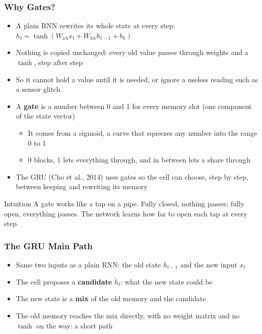 \begin{frame}[fragile] \frametitle{Why Gates?}
\begin{itemize}
\item A plain RNN rewrites its whole state at every step: $h_t = \tanh(W_{xh}x_t + W_{hh}h_{t-1} + b_h)$
\item Nothing is copied unchanged: every old value passes through weights and a $\tanh$, step after step
\item So it cannot hold a value until it is needed, or ignore a useless reading such as a sensor glitch
\item A \textbf{gate} is a number between 0 and 1 for every memory slot (one component of the state vector)
  \begin{itemize}
  \item It comes from a sigmoid, a curve that squeezes any number into the range 0 to 1
  \item 0 blocks, 1 lets everything through, and in between lets a share through
  \end{itemize}
\item The GRU (Cho et al., 2014) uses gates so the cell can choose, step by step, between keeping and rewriting its memory
\end{itemize}
\begin{block}{Intuition}
A gate works like a tap on a pipe. Fully closed, nothing passes; fully open, everything passes. The network learns how far to open each tap at every step.
\end{block}
\end{frame}


\begin{frame}[fragile] \frametitle{The GRU Main Path}
\begin{center}
\end{center}
\begin{itemize}
\item Same two inputs as a plain RNN: the old state $h_{t-1}$ and the new input $x_t$
\item The cell proposes a \textbf{candidate} $\tilde{h}_t$: what the new state could be
\item The new state is a \textbf{mix} of the old memory and the candidate
\item The old memory reaches the mix directly, with no weight matrix and no $\tanh$ on the way: a short path
\end{itemize}
\end{frame}


